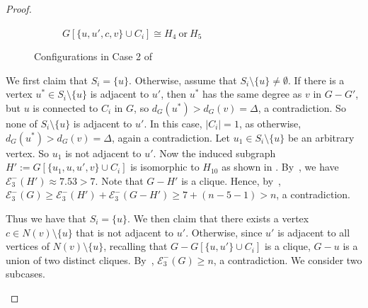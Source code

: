 \documentclass[a4paper,12pt]{article}
\theoremstyle{plain}
\newenvironment{proof*}{\noindent \emph{Proof of the claim.}}{\hfill$\Diamond$}
\begin{document}
\begin{proof}
\begin{proof*}
\begin{figure}[ht]
\begin{subfigure}[t]{.5\textwidth}
\caption{$G[\{u,u',c,v\}\cup C_i]\cong H_{4}~\text{or}~H_{5}$}
\label{fig:H4H5inClaim3.9}
\end{subfigure}
\caption{Configurations in Case 2 of }
\label{fig:LastCase}
\end{figure}

We first claim that $S_i=\{u\}$. Otherwise, assume that $S_i\setminus \{u\}\neq\emptyset$. If there is a vertex $u^*\in S_i\setminus \{u\}$ is adjacent to $u'$, then $u^*$ has the same degree as $v$ in $G-G'$, but $u$ is connected to $C_i$ in $G$, so  $d_G(u^*)>d_G(v)=\Delta$, a contradiction. So none of $ S_i\setminus \{u\}$ is adjacent to $u'$. In this case, $|C_i|=1$, as otherwise, $d_G(u^*)>d_G(v)=\Delta$, again a contradiction. Let $u_1\in S_i\setminus \{u\}$ be an arbitrary vertex. So $u_1$ is not adjacent to $u'$. Now the induced subgraph $H':=G[\{u_1,u,u',v\}\cup C_i]$ is isomorphic to $H_{10}$ as shown in . By~, we have $\mathcal{E}_3^{-}(H')\approx 7.53>7$. Note that $G-H'$ is a clique. Hence, by~, $
\mathcal{E}_3^{-}(G) \geq \mathcal{E}_3^{-}(H') + \mathcal{E}_3^{-}(G-H') \geq 7+(n-5-1)> n$, a contradiction. 

Thus we have that $S_i=\{u\}$. We then claim that there exists a vertex $c\in N(v)\setminus \{u\}$ that is not adjacent to $u'$. Otherwise, since $u'$ is adjacent to all vertices of $N(v)\setminus \{u\}$, recalling that $G-G[\{u,u'\}\cup C_i]$ is a clique, $G-u$ is a union of two distinct cliques. By~,  $
\mathcal{E}_3^{-}(G)\geq n$, a contradiction. We consider two subcases. 


\end{proof*}
\end{proof}
\end{document}
